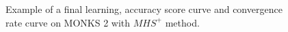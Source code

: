 \begin{appendices}
\begin{figure}[H]
\begin{subfigure}{0.40\textwidth}
                    \label{fig:monks_2_ACC_CGD}
                \end{subfigure}
                \begin{subfigure}{0.40\textwidth}
                    \caption{}
                    \label{fig:monks_2_NORM_CGD}
                \end{subfigure}
                \caption{Example of a final learning, accuracy score curve and
                convergence rate curve on MONKS 2  with $MHS^+$ method.}
                \label{fig:monks_2_CGD}
            \end{figure}


\end{appendices}
